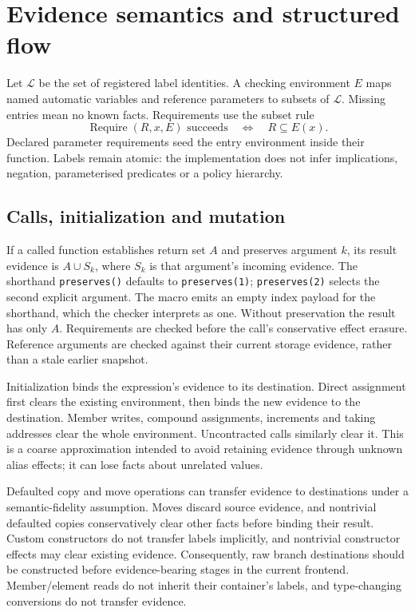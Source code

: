 \documentclass[11pt]{article}
\newcommand{\labels}{\mathcal L}
\begin{document}
\section{Evidence semantics and structured flow}
Let $\labels$ be the set of registered label identities. A checking environment
$E$ maps named automatic variables and reference parameters to subsets of
$\labels$. Missing entries mean no known facts. Requirements use the subset rule
\[
  \operatorname{Require}(R,x,E)\text{ succeeds}\quad\Longleftrightarrow\quad
  R\subseteq E(x).
\]
Declared parameter requirements seed the entry environment inside their
function. Labels remain atomic: the implementation does not infer implications,
negation, parameterised predicates or a policy hierarchy.

\subsection{Calls, initialization and mutation}
If a called function establishes return set $A$ and preserves argument $k$, its
result evidence is $A\cup S_k$, where $S_k$ is that argument's incoming evidence.
The shorthand \texttt{preserves()} defaults to \texttt{preserves(1)};
\texttt{preserves(2)} selects the second explicit argument. The macro emits
an empty index payload for the shorthand, which the checker interprets as one.
Without preservation the result has only $A$. Requirements are checked before
the call's conservative effect erasure. Reference arguments are checked against
their current storage evidence, rather than a stale earlier snapshot.

Initialization binds the expression's evidence to its destination. Direct
assignment first clears the existing environment, then binds the new evidence
to the destination. Member writes, compound assignments, increments and taking
addresses clear the whole environment. Uncontracted calls similarly clear it.
This is a coarse approximation intended to avoid retaining evidence through
unknown alias effects; it can lose facts about unrelated values.

Defaulted copy and move operations can transfer evidence to destinations
under a semantic-fidelity assumption. Moves discard source evidence, and
nontrivial defaulted copies conservatively clear other facts before binding
their result. Custom constructors do not transfer labels implicitly, and
nontrivial constructor effects may clear existing evidence. Consequently,
raw branch destinations should be constructed before evidence-bearing stages
in the current frontend. Member/element reads do not inherit their container's
labels, and type-changing conversions do not transfer evidence.
\end{document}
